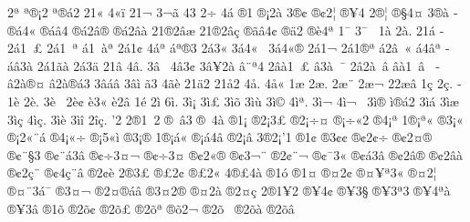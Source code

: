 {^^ad2^^aa^^ad
^^ad^^aa^^ae^^a12
^^ad^^aa^^ae^^e12
2^^ad1^^ab
4^^ad^^ab^^ef
2^^ad1^^ac
3^^ad^^ac^^e3
4^^ad3^^ad
^^ad^^ad2^^f7
^^ad4^^ad^^e1
^^ad^^ae1
^^ad^^ae^^a12^^e0
3^^ad^^ae^^a2
^^ad^^ae^^a22^^a6
^^ad^^ae^^a54
2^^ad^^ae^^a6
^^ad^^ae^^a74^^a4
3^^ad^^ae^^e0
^^ad^^ae^^e14^^ab
^^ad^^ae^^e1^^e24
^^ad^^ae^^e12^^e2^^ae
^^ad^^ae^^e12^^e2^^e0
2^^ad1^^ae2^^e2^^e6
2^^ad1^^ae2^^e2^^e7
^^ad^^ae^^e3^^e24^^a2
^^ad^^ae^^e42
^^ad^^ae^^e84^^aa
^^ad1^^af
3^^ad^^af^^a0
^^ad1^^e0
2^^ad^^e0.
2^^ad1^^e1
^^ad2^^e11^^a0^^a3
^^ad2^^e11^^a0^^aa
^^ad^^e11^^a0^^e0^^aa
^^ad2^^e11^^a2
^^ad4^^e1^^aa
^^ad^^e1^^aa^^ae3
^^ad2^^e13^^ab
^^ad3^^e14^^ab^^a0
^^ad3^^e14^^ab^^ae
^^ad2^^e11^^ac
^^ad2^^e11^^ae^^aa
^^ad^^e12^^e2^^a0^^ab
^^ad^^e14^^e2^^aa
^^ad^^e1^^e23^^e0
^^ad2^^e11^^e3^^e0
^^ad2^^e13^^e4
2^^ad1^^e2
4^^ad^^e2.
^^ad3^^e2^^a0
^^ad4^^e23^^a2
3^^ad^^e2^^a52^^e0^^ad
^^ad^^e2^^a8^^aa4
^^ad2^^e2^^e01^^a0^^a3
^^ad^^e23^^e0^^a0^^af
^^ad2^^e22^^e0^^a0^^e2
^^ad^^e2^^e01^^a0^^e2^^a0
^^ad^^e22^^e0^^ae^^a4
^^ad^^e22^^e0^^ae^^e13
^^ad3^^e2^^e1^^e2
^^ad3^^e2^^ec
^^ad^^e33
4^^ad^^e3^^e8
2^^ad1^^e42
2^^ad1^^e52
4^^ad^^e5.
4^^ad^^e5^^ab
^^ad1^^e6
2^^ad^^e6.
2^^ad^^e6^^a8
2^^ad^^e6^^ac
2^^ad2^^e6^^e2
^^ad1^^e7
2^^ad^^e7.
^^ad1^^e8
2^^ad^^e8.
3^^ad^^e8^^a0
2^^ad^^e8^^a2
^^ad^^e83^^ab
^^ad^^e82^^e2
^^ad1^^e9
2^^ad^^ec
6^^ad^^ec.
3^^ad^^ec^^a1
3^^ad^^ec^^a3
3^^ad^^ec^^f5
3^^ad^^ec^^f9
3^^ad^^ec^^a9
4^^ad^^ec^^aa.
3^^ad^^ec^^ac
4^^ad^^ec^^ac^^a0
3^^ad^^ec^^ae
^^ad^^ec^^ae^^e12
3^^ad^^ec^^e1
3^^ad^^ec^^e6
3^^ad^^ec^^e7
4^^ad^^ec^^e7.
3^^ad^^ec^^e8
3^^ad^^ec^^ee
2^^ad^^ee^^e7.
^^ad'2
2^^ae1^^a02
^^ae^^a0^^ad^^e23
^^ae^^a04^^e0
^^ae1^^a1
^^ae2^^a13^^a3
^^ae2^^a1^^f7^^a4
^^ae^^a1^^f7^^ab2
^^ae4^^a1^^aa
1^^ae^^a1^^aa^^ab
^^ae3^^a1^^ab
^^ae^^a12^^ab^^a8^^e1
^^ae4^^a1^^ab^^f7
^^ae^^a15^^ab^^ec
^^ae3^^a1^^ae
1^^ae^^a1^^e1^^ab
^^ae^^a1^^e14^^e2
^^ae2^^a1^^e2
3^^ae2^^a1'1
^^ae1^^a2
^^ae3^^a2^^a2
^^ae^^a22^^a2^^f7
^^ae^^a22^^a4^^ae
^^ae^^a2^^a8^^a73^^ad
^^ae^^a2^^a8^^e13^^e2
^^ae^^a2^^f73^^a4^^ac
^^ae^^a2^^f73^^a4^^ad
^^ae^^a22^^ab^^ae
^^ae^^a23^^ac^^a8
^^ae2^^a2^^ad^^a8^^ac
^^ae^^a2^^af3^^ab
^^ae^^a2^^e13^^e2
^^ae^^a22^^e2^^ae
^^ae^^a22^^e2^^e0
^^ae^^a22^^e7^^a8
^^ae^^a24^^e7^^a8^^e2
^^ae2^^a2^^e8
2^^ae3^^a3
^^ae^^a32^^a2
^^ae^^a32^^ab
4^^ae^^a34^^e0
^^ae1^^f3
^^ae1^^a4
^^ae^^a42^^a2
^^ae^^a4^^a5^^aa3^^ab
^^ae^^a42^^a6
^^ae^^a4^^a83^^e1^^af
^^ae3^^a4^^ac
^^ae2^^a4^^ad^^ae^^e1^^e2
^^ae3^^a42^^ae
^^ae^^a42^^e0
^^ae2^^a4^^e7
2^^ae1^^a52
^^ae^^a54^^a2
^^ae^^a53^^a7
^^ae^^a53^^aa3
^^ae^^a54^^aa^^e0
^^ae^^a53^^e2
^^ae1^^f5
^^ae2^^f5^^a2
^^ae2^^f5^^a3
^^ae2^^f5^^aa
^^ae^^f52^^ac
^^ae2^^f5^^ad^^a0
^^ae2^^f5^^e0
^^ae2^^f5^^e2
}
